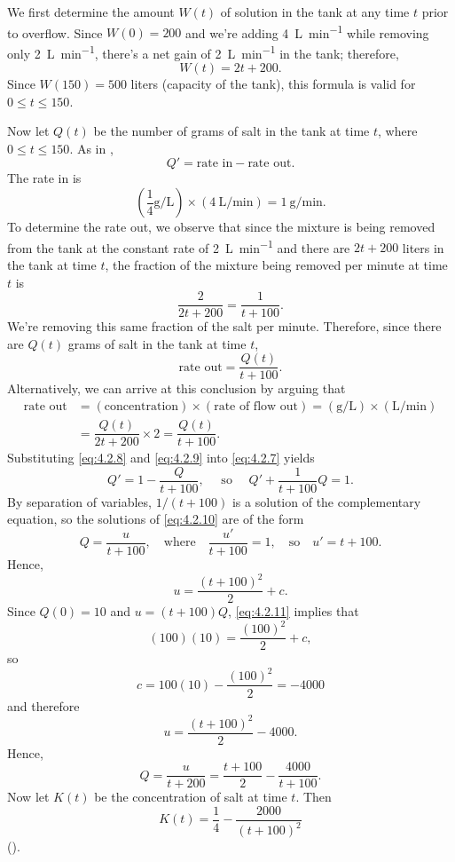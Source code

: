 \begin{solution}
We first determine the
amount $W(t)$ of solution in the tank at any time $t$ prior to
overflow.  Since $W(0) = 200$ and we're adding \qty{4}{\liter\per\minute} while
 removing only \qty{2}{\liter\per\minute}, there's a net gain
of \qty{2}{\liter\per\minute} in the tank;  therefore,
\[
W(t) = 2t+200.
\]
 Since $W(150)=500$ liters (capacity of the
tank), this formula is valid for $0 \le t \le 150$.

Now let $Q(t)$ be the number of grams of salt in the tank
at time $t$, where  $0 \le t \le 150$.  As in ,
\begin{equation} \label{eq:4.2.7}
Q' = \text{rate in}-\text{rate out}.
\end{equation}
 The rate in is
\begin{equation}\label{eq:4.2.8}
\left(\frac{1}{4}\unit{\gram\per\liter}\right) \times (\qty{4}{\liter\per\minute}) = \qty{1}{\gram\per\minute}.
\end{equation}
 To determine the rate out, we observe that since
the mixture is being removed from the tank at the constant
rate of \qty{2}{\liter\per\minute} and there are $2t+200$
liters in the tank at time $t$, the fraction of the mixture
being removed per minute at time $t$ is
\[
\frac{2}{2t+200} = \frac{1}{t+100}.
\]
We're removing this same fraction of the salt per
minute.  Therefore, since there are $Q(t)$ grams of salt in
the tank at time $t$,
\begin{equation} \label{eq:4.2.9}
\text{rate out} = \frac{Q(t)}{t+100}.
\end{equation}
Alternatively, we can arrive at this conclusion by arguing that
\begin{align*}
\text{rate out} & = (\text{concentration})\times(\text{rate of flow out})
=(\unit{\gram\per\liter})\times(\unit{\liter\per\minute})\\
&=\dfrac{Q(t)}{2t+200}\times
2=\dfrac{Q(t)}{t+100}.
\end{align*}
 Substituting \eqref{eq:4.2.8} and \eqref{eq:4.2.9} into \eqref{eq:4.2.7}
yields
\begin{equation} \label{eq:4.2.10}
Q'=1-\frac{Q}{t+100},\quad\text{ so }\quad
Q'+\frac{1}{t+100} Q=1.
\end{equation}
By separation of variables, $1/(t+100)$ is a solution of the
complementary equation, so the solutions of \eqref{eq:4.2.10}
are of the form
\[
Q=\frac{u}{t+100},\quad\text{where}\quad\frac{u'}{t+100}=1,\quad\text{so}\quad u'=t+100.
\]
Hence,
\begin{equation} \label{eq:4.2.11}
u = \frac{(t+100)^2}{2}+c.
\end{equation}
Since $Q(0)=10$  and $u=(t+100)Q$, \eqref{eq:4.2.11} implies that
\[
(100)(10) = \frac{(100)^2}{2}+c,
\]
so
\[
c=100(10)-\frac{(100)^2}{2} =-4000
\]
and therefore
\[
u = \frac{(t+100)^2}{2} -4000.
\]
Hence,
\[
Q = \frac{u}{t+200}= \frac{t+100}{2}-\frac{4000}{t+100}.
\]
Now let $K(t)$ be the concentration of salt at
time $t$.  Then
\[
K(t) = \frac{1}{4}-\frac{2000}{(t+100)^2}
\]
().
\end{solution}

